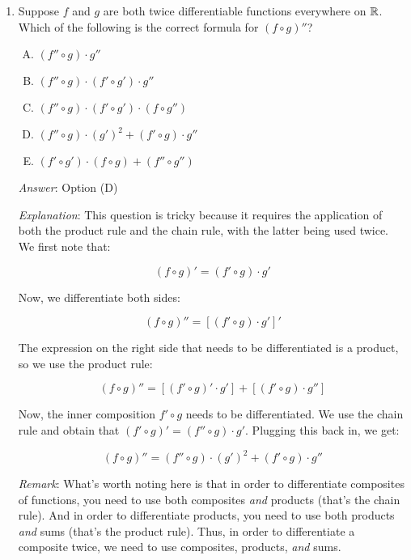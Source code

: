 \documentclass[10pt]{amsart}
\begin{document}
\begin{enumerate}

\item Suppose $f$ and $g$ are both twice differentiable functions
  everywhere on $\mathbb{R}$. Which of the following is the correct formula
  for $(f \circ g)''$?

  \begin{enumerate}[(A)]

  \item $(f'' \circ g) \cdot g''$
  \item $(f'' \circ g) \cdot (f' \circ g') \cdot g''$
  \item $(f'' \circ g) \cdot (f' \circ g') \cdot (f \circ g'')$
  \item $(f'' \circ g) \cdot (g')^2 + (f' \circ g) \cdot g''$
  \item $(f' \circ g') \cdot (f \circ g) + (f'' \circ g'')$
  \end{enumerate}

  {\em Answer}: Option (D)

  {\em Explanation}: This question is tricky because it requires the
  application of both the product rule and the chain rule, with the
  latter being used twice. We first note that:

  $$(f \circ g)' = (f' \circ g) \cdot g'$$

  Now, we differentiate both sides:

  $$(f \circ g)'' = [(f' \circ g) \cdot g']'$$

  The expression on the right side that needs to be differentiated is
  a product, so we use the product rule:

  $$(f \circ g)'' = [(f' \circ g)' \cdot g'] + [(f' \circ g) \cdot g'']$$

  Now, the inner composition $f' \circ g$ needs to be
  differentiated. We use the chain rule and obtain that $(f' \circ g)'
  = (f'' \circ g) \cdot g'$. Plugging this back in, we get:

  $$(f \circ g)'' = (f'' \circ g) \cdot (g')^2 + (f' \circ g) \cdot g''$$

  {\em Remark}: What's worth noting here is that in order to
  differentiate composites of functions, you need to use both
  composites {\em and} products (that's the chain rule). And in order
  to differentiate products, you need to use both products {\em and}
  sums (that's the product rule). Thus, in order to differentiate a
  composite twice, we need to use composites, products, {\em and}
  sums.


\end{enumerate}
\end{document}
